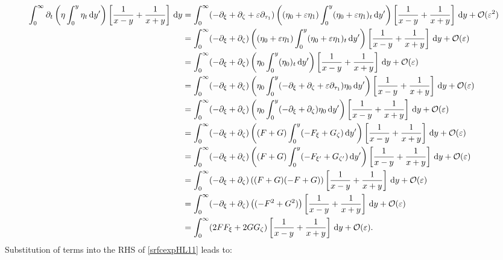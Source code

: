 \documentclass[10pt,reqno,oneside,a4paper, landscape]{article}
\begin{document}
\begin{align*}
\int_0^\infty \partial_t \left( \eta \int^{y}_0\eta_{t} \,\mathrm{d} y' \right) \left[ \frac{1}{x-y} + \frac{1}{x+y} \right] \,\mathrm{d} y &= \int_0^\infty (- \partial_\xi + \partial_\zeta + \varepsilon \partial_{\tau_1})\left( (\eta_0 + \varepsilon \eta_1) \int^{y}_0(\eta_0 + \varepsilon \eta_1)_{t} \,\mathrm{d} y' \right) \left[ \frac{1}{x-y} + \frac{1}{x+y} \right] \,\mathrm{d} y + \mathcal{O}(\varepsilon^2)\\
&= \int_0^\infty (- \partial_\xi + \partial_\zeta)\left( (\eta_0 + \varepsilon \eta_1) \int^{y}_0(\eta_0 + \varepsilon \eta_1)_{t} \,\mathrm{d} y' \right) \left[ \frac{1}{x-y} + \frac{1}{x+y} \right] \,\mathrm{d} y + \mathcal{O}(\varepsilon)\\
&= \int_0^\infty (- \partial_\xi + \partial_\zeta)\left( \eta_0 \int^{y}_0 (\eta_0)_{t} \,\mathrm{d} y' \right) \left[ \frac{1}{x-y} + \frac{1}{x+y} \right] \,\mathrm{d} y + \mathcal{O}(\varepsilon)\\
&= \int_0^\infty (- \partial_\xi + \partial_\zeta)\left( \eta_0 \int^{y}_0 (- \partial_\xi + \partial_\zeta + \varepsilon \partial_{\tau_1})\eta_0 \,\mathrm{d} y' \right) \left[ \frac{1}{x-y} + \frac{1}{x+y} \right] \,\mathrm{d} y + \mathcal{O}(\varepsilon)\\
&= \int_0^\infty (- \partial_\xi + \partial_\zeta)\left( \eta_0 \int^{y}_0 (- \partial_\xi + \partial_\zeta)\eta_0 \,\mathrm{d} y' \right) \left[ \frac{1}{x-y} + \frac{1}{x+y} \right] \,\mathrm{d} y + \mathcal{O}(\varepsilon)\\
&= \int_0^\infty (- \partial_\xi + \partial_\zeta)\left( (F+G) \int^{y}_0 (-F_{\xi} + G_\zeta) \,\mathrm{d} y' \right) \left[ \frac{1}{x-y} + \frac{1}{x+y} \right] \,\mathrm{d} y + \mathcal{O}(\varepsilon)\\
&= \int_0^\infty (- \partial_\xi + \partial_\zeta)\left( (F+G) \int^{y}_0 (-F_{\xi'} + G_{\zeta'}) \,\mathrm{d} y' \right) \left[ \frac{1}{x-y} + \frac{1}{x+y} \right] \,\mathrm{d} y + \mathcal{O}(\varepsilon)\\
&= \int_0^\infty (- \partial_\xi + \partial_\zeta)\left( (F+G) (-F + G) \right) \left[ \frac{1}{x-y} + \frac{1}{x+y} \right] \,\mathrm{d} y + \mathcal{O}(\varepsilon)\\
&= \int_0^\infty (- \partial_\xi + \partial_\zeta)\left( (-F^2 + G^2) \right) \left[ \frac{1}{x-y} + \frac{1}{x+y} \right] \,\mathrm{d} y + \mathcal{O}(\varepsilon)\\
&= \int_0^\infty ( 2FF_\xi + 2GG_\zeta) \left[ \frac{1}{x-y} + \frac{1}{x+y} \right] \,\mathrm{d} y + \mathcal{O}(\varepsilon).
\end{align*}
Substitution of terms into the RHS of \eqref{srfcexpHL11} leads to:
\end{document}
